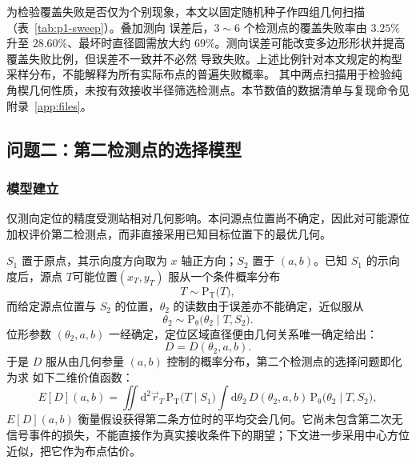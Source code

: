 为检验覆盖失败是否仅为个别现象，本文以固定随机种子作四组几何扫描（表~\ref{tab:p1-sweep}）。叠加测向
误差后，$3\sim6$ 个检测点的覆盖失败率由 $3.25\%$ 升至 $28.60\%$、最坏时直径圆需放大约
$69\%$。测向误差可能改变多边形形状并提高覆盖失败比例，但误差不一致并不必然
导致失败。上述比例针对本文规定的构型采样分布，不能解释为所有实际布点的普遍失败概率。
其中两点扫描用于检验纯角楔几何性质，未按有效接收半径筛选检测点。本节数值的数据清单与复现命令见附录~\ref{app:files}。

\subsection{问题二：第二检测点的选择模型}
\subsubsection{模型建立}
仅测向定位的精度受测站相对几何影响\cite{bishop2010}。本问源点位置尚不确定，因此对可能源位加权评价第二检测点，而非直接采用已知目标位置下的最优几何。
\noindent\hspace{0.2em}{\heiti 记号与概率描述}\songti

$S_1$ 置于原点，其示向度方向取为 $x$ 轴正方向；$S_2$ 置于 $(a,b)$。已知 $S_1$
的示向度后，源点 $T$可能位置$(x_T,y_T)$ 服从一个条件概率分布
\begin{equation}
    T\sim \mathrm{P_{T}}\bigl(T\bigr),
    \label{eq:posterior}
\end{equation}
而给定源点位置与 $S_2$ 的位置，$\theta_2$ 的读数由于误差亦不能确定，近似服从
\begin{equation}
    \theta_2\sim \mathrm{P_{\theta}}\bigl(\theta_2\mid T,S_2\bigr).
    \label{eq:theta2-dist}
\end{equation}
位形参数 $(\theta_2,a,b)$ 一经确定，定位区域直径便由几何关系唯一确定给出：
\begin{equation}
    D=D(\theta_2,a,b).
    \label{eq:D-geometry}
\end{equation}
于是 $D$ 服从由几何参量 $(a,b)$ 控制的概率分布，第二个检测点的选择问题即化为求
如下二维价值函数：
\begin{equation}
    E[D](a,b)=\iint \mathrm{d}^2\vec r_T\,
    \mathrm{P_T}\bigl(T\mid S_1\bigr)
    \int \mathrm{d}\theta_2\,
    D(\theta_2,a,b)\,\mathrm{P_{\theta}}\bigl(\theta_2\mid T,S_2\bigr),
    \label{eq:value-function}
\end{equation}
$E[D](a,b)$ 衡量假设获得第二条方位时的平均交会几何。它尚未包含第二次无信号事件的损失，不能直接作为真实接收条件下的期望；下文进一步采用中心方位近似，把它作为布点估价。

